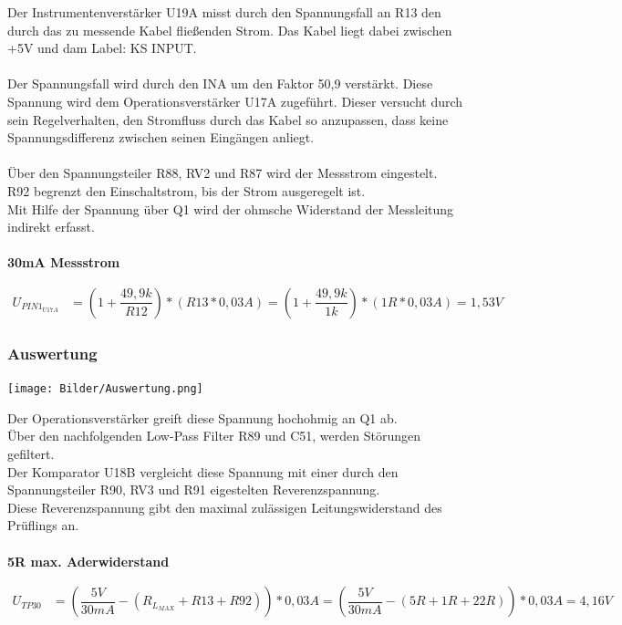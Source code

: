 \documentclass[a4paper,11pt]{scrartcl}
\begin{document}
Der Instrumentenverstärker U19A misst durch den Spannungsfall an R13 den durch das zu messende Kabel fließenden Strom. Das Kabel liegt dabei zwischen +5V und dam Label: KS INPUT.
\\
\\
Der Spannungsfall wird durch den INA um den Faktor 50,9 verstärkt. Diese Spannung wird dem Operationsverstärker U17A zugeführt. Dieser versucht durch sein Regelverhalten, den Stromfluss durch das Kabel so anzupassen, dass keine Spannungsdifferenz zwischen seinen Eingängen anliegt.
\\
\\
Über den Spannungsteiler R88, RV2 und R87 wird der Messstrom eingestelt. 
\\
R92 begrenzt den Einschaltstrom, bis der Strom ausgeregelt ist. 
\\
Mit Hilfe der Spannung über Q1 wird der ohmsche Widerstand der Messleitung indirekt erfasst.
\\
\\
\textbf{30mA Messstrom}
\\
\begin{center}
\begin{align}
	U_{PIN1_{U17A}} &= (1 + \dfrac{49,9k}{R12}) * (R13 * 0,03A) = (1 + \dfrac{49,9k}{1k}) * (1R * 0,03A) = 1,53V
\end{align} 
\end{center}


\newpage
\subsubsection{Auswertung}
\begin{center}
\texttt{[image: Bilder/Auswertung.png]}
\end{center}

Der Operationsverstärker greift diese Spannung hochohmig an Q1 ab. 
\\
Über den nachfolgenden Low-Pass Filter R89 und C51, werden Störungen gefiltert.
\\
Der Komparator U18B vergleicht diese Spannung mit einer durch den Spannungsteiler R90, RV3 und R91 eigestelten Reverenzspannung. 
\\
Diese Reverenzspannung gibt den maximal zulässigen Leitungswiderstand des Prüflings an. 
\\
\\
\textbf{5R max. Aderwiderstand}
\\
\begin{center}
\begin{align}
	U_{TP30} &= (\dfrac{5V}{30mA} - (R_{L_{MAX}} + R13 + R92)) * 0,03A = (\dfrac{5V}{30mA} - (5R + 1R + 22R)) * 0,03A = 4,16V
\end{align}
\end{center}
\end{document}
